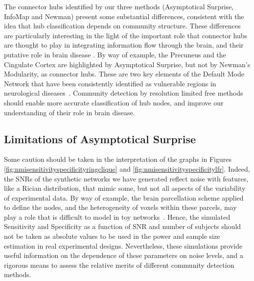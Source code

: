 The connector hubs identified by our three methods (Asymptotical Surprise, InfoMap and Newman) present some substantial differences, consistent with the idea that hub classification depends on community structure. These differences are particularly interesting in the light of the important role that connector hubs are thought to play in integrating information flow through the brain, and their putative role in brain disease \cite{crossley2014,stam2014}. By way of example, the Precuneus and the Cingulate Cortex are highlighted by Asymptotical Surprise, but not by Newman's Modularity, as connector hubs. These are two key elements of the Default Mode Network that have been consistently identified as vulnerable regions in neurological diseases~\cite{vandenheuvel2013a,buckner2009}. 
Community detection by resolution limited free methods should enable more accurate classification of hub nodes, and improve our understanding of their role in brain disease. 

\subsection{Limitations of Asymptotical Surprise}
Some caution should be taken in the interpretation of the graphs in Figures \ref{fig:nmisensitivityspecificityringclique} and \ref{fig:nmisensitivityspecificitylfr}.
Indeed, the SNRs of the synthetic networks we have generated reflect noise with features, like a Rician distribution, that mimic some, but not all aspects of the variability of experimental data.
By way of example, the brain parcellation scheme applied to define the nodes, and the heterogeneity of voxels within these parcels, may play a role that is difficult to model in toy networks~\cite{fornito2010}.
Hence, the simulated Sensitivity and Specificity as a function of SNR and number of subjects should not be taken as absolute values to be used in the power and sample size estimation in real experimental designs.
Nevertheless, these simulations provide useful information on the dependence of these parameters on noise levels, and a rigorous means to assess the relative merits of different community detection methods.

